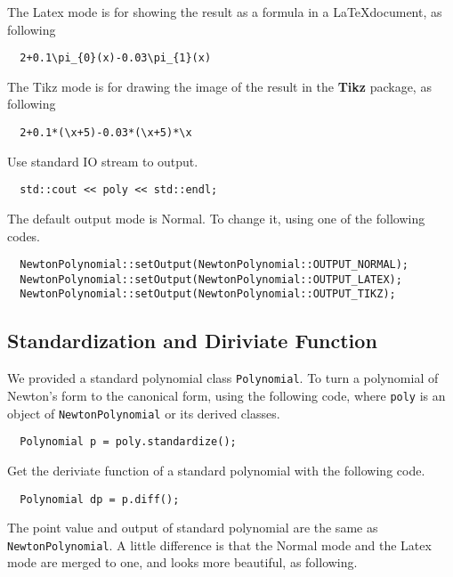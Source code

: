 \documentclass[11pt,en]{elegantpaper}
\begin{document}
The Latex mode is for showing the result as a formula in a \LaTeX document, as following

\begin{lstlisting}
  2+0.1\pi_{0}(x)-0.03\pi_{1}(x)
\end{lstlisting}

The Tikz mode is for drawing the image of the result in the \textbf{Tikz} package, as following

\begin{lstlisting}
  2+0.1*(\x+5)-0.03*(\x+5)*\x
\end{lstlisting}

Use standard IO stream to output.

\begin{lstlisting}
  std::cout << poly << std::endl;
\end{lstlisting}

The default output mode is Normal. To change it, using one of the following codes.

\begin{lstlisting}
  NewtonPolynomial::setOutput(NewtonPolynomial::OUTPUT_NORMAL);
  NewtonPolynomial::setOutput(NewtonPolynomial::OUTPUT_LATEX);
  NewtonPolynomial::setOutput(NewtonPolynomial::OUTPUT_TIKZ);
\end{lstlisting}

\subsection{Standardization and Diriviate Function}

We provided a standard polynomial class \verb|Polynomial|. To turn a polynomial of Newton's form to the canonical form, using the following code, where \verb|poly| is an object of \verb|NewtonPolynomial| or its derived classes.

\begin{lstlisting}
  Polynomial p = poly.standardize();
\end{lstlisting}

Get the deriviate function of a standard polynomial with the following code.

\begin{lstlisting}
  Polynomial dp = p.diff();
\end{lstlisting}

The point value and output of standard polynomial are the same as \verb|NewtonPolynomial|. A little difference is that the Normal mode and the Latex mode are merged to one, and looks more beautiful, as following.
\end{document}
